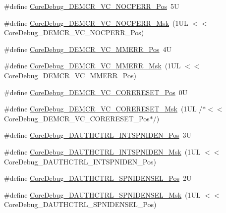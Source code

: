 \begin{DoxyCompactItemize}
\item 
\#define \mbox{\hyperlink{group___c_m_s_i_s___core_debug_gac9d13eb2add61f610d5ced1f7ad2adf8}{Core\+Debug\+\_\+\+D\+E\+M\+C\+R\+\_\+\+V\+C\+\_\+\+N\+O\+C\+P\+E\+R\+R\+\_\+\+Pos}}~5U
\item 
\#define \mbox{\hyperlink{group___c_m_s_i_s___core_debug_ga03ee58b1b02fdbf21612809034562f1c}{Core\+Debug\+\_\+\+D\+E\+M\+C\+R\+\_\+\+V\+C\+\_\+\+N\+O\+C\+P\+E\+R\+R\+\_\+\+Msk}}~(1\+U\+L $<$$<$ Core\+Debug\+\_\+\+D\+E\+M\+C\+R\+\_\+\+V\+C\+\_\+\+N\+O\+C\+P\+E\+R\+R\+\_\+\+Pos)
\item 
\#define \mbox{\hyperlink{group___c_m_s_i_s___core_debug_ga444454f7c7748e76cd76c3809c887c41}{Core\+Debug\+\_\+\+D\+E\+M\+C\+R\+\_\+\+V\+C\+\_\+\+M\+M\+E\+R\+R\+\_\+\+Pos}}~4U
\item 
\#define \mbox{\hyperlink{group___c_m_s_i_s___core_debug_gad420a9b60620584faaca6289e83d3a87}{Core\+Debug\+\_\+\+D\+E\+M\+C\+R\+\_\+\+V\+C\+\_\+\+M\+M\+E\+R\+R\+\_\+\+Msk}}~(1\+U\+L $<$$<$ Core\+Debug\+\_\+\+D\+E\+M\+C\+R\+\_\+\+V\+C\+\_\+\+M\+M\+E\+R\+R\+\_\+\+Pos)
\item 
\#define \mbox{\hyperlink{group___c_m_s_i_s___core_debug_ga9fcf09666f7063a7303117aa32a85d5a}{Core\+Debug\+\_\+\+D\+E\+M\+C\+R\+\_\+\+V\+C\+\_\+\+C\+O\+R\+E\+R\+E\+S\+E\+T\+\_\+\+Pos}}~0U
\item 
\#define \mbox{\hyperlink{group___c_m_s_i_s___core_debug_ga906476e53c1e1487c30f3a1181df9e30}{Core\+Debug\+\_\+\+D\+E\+M\+C\+R\+\_\+\+V\+C\+\_\+\+C\+O\+R\+E\+R\+E\+S\+E\+T\+\_\+\+Msk}}~(1\+U\+L /$\ast$$<$$<$ Core\+Debug\+\_\+\+D\+E\+M\+C\+R\+\_\+\+V\+C\+\_\+\+C\+O\+R\+E\+R\+E\+S\+E\+T\+\_\+\+Pos$\ast$/)
\item 
\#define \mbox{\hyperlink{group___c_m_s_i_s___core_debug_gaf733a36e6b4717a604f7d77c05dfceb4}{Core\+Debug\+\_\+\+D\+A\+U\+T\+H\+C\+T\+R\+L\+\_\+\+I\+N\+T\+S\+P\+N\+I\+D\+E\+N\+\_\+\+Pos}}~3U
\item 
\#define \mbox{\hyperlink{group___c_m_s_i_s___core_debug_gadad0bf68d32cba49c1ea7534122c2752}{Core\+Debug\+\_\+\+D\+A\+U\+T\+H\+C\+T\+R\+L\+\_\+\+I\+N\+T\+S\+P\+N\+I\+D\+E\+N\+\_\+\+Msk}}~(1\+U\+L $<$$<$ Core\+Debug\+\_\+\+D\+A\+U\+T\+H\+C\+T\+R\+L\+\_\+\+I\+N\+T\+S\+P\+N\+I\+D\+E\+N\+\_\+\+Pos)
\item 
\#define \mbox{\hyperlink{group___c_m_s_i_s___core_debug_ga866734a8e4bec2d6cf091e265c6c0f3d}{Core\+Debug\+\_\+\+D\+A\+U\+T\+H\+C\+T\+R\+L\+\_\+\+S\+P\+N\+I\+D\+E\+N\+S\+E\+L\+\_\+\+Pos}}~2U
\item 
\#define \mbox{\hyperlink{group___c_m_s_i_s___core_debug_gaabb5d6c750c9ec50254134ece2111dcd}{Core\+Debug\+\_\+\+D\+A\+U\+T\+H\+C\+T\+R\+L\+\_\+\+S\+P\+N\+I\+D\+E\+N\+S\+E\+L\+\_\+\+Msk}}~(1\+U\+L $<$$<$ Core\+Debug\+\_\+\+D\+A\+U\+T\+H\+C\+T\+R\+L\+\_\+\+S\+P\+N\+I\+D\+E\+N\+S\+E\+L\+\_\+\+Pos)

\end{DoxyCompactItemize}
